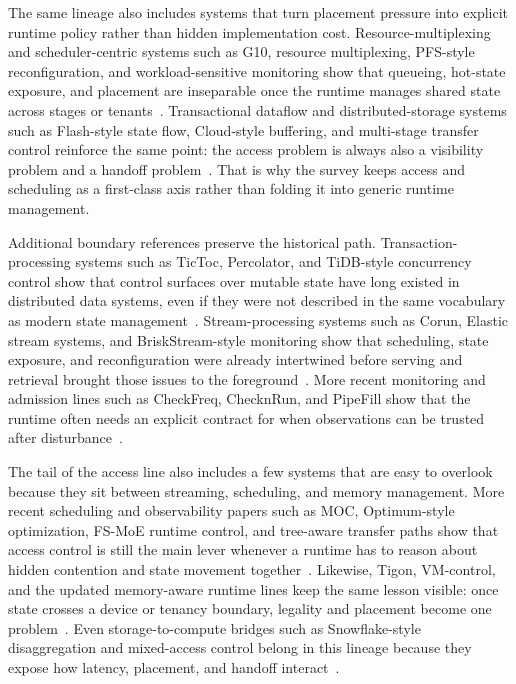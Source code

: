 The same lineage also includes systems that turn placement pressure into explicit runtime policy rather than hidden implementation cost. Resource-multiplexing and scheduler-centric systems such as G10, resource multiplexing, PFS-style reconfiguration, and workload-sensitive monitoring show that queueing, hot-state exposure, and placement are inseparable once the runtime manages shared state across stages or tenants~\cite{jiang2024megascale,he2025resourcemultiplexing,domingo2021pfsck,jiang2025shadowviews}. Transactional dataflow and distributed-storage systems such as Flash-style state flow, Cloud-style buffering, and multi-stage transfer control reinforce the same point: the access problem is always also a visibility problem and a handoff problem~\cite{fu2022sfs,fu2024autocheck,gao2025deck,li2020pegasus}. That is why the survey keeps access and scheduling as a first-class axis rather than folding it into generic runtime management.

Additional boundary references preserve the historical path. Transaction-processing systems such as TicToc, Percolator, and TiDB-style concurrency control show that control surfaces over mutable state have long existed in distributed data systems, even if they were not described in the same vocabulary as modern state management~\cite{yu2016tictoc,peng2010percolator}. Stream-processing systems such as Corun, Elastic stream systems, and BriskStream-style monitoring show that scheduling, state exposure, and reconfiguration were already intertwined before serving and retrieval brought those issues to the foreground~\cite{zhang2016corun,zhang2016elastic,zhang2019briskstream}. More recent monitoring and admission lines such as CheckFreq, ChecknRun, and PipeFill show that the runtime often needs an explicit contract for when observations can be trusted after disturbance~\cite{mohan2021checkfreq,eisenman2022checknrun,arfeen2024pipefill}.

The tail of the access line also includes a few systems that are easy to overlook because they sit between streaming, scheduling, and memory management. More recent scheduling and observability papers such as MOC, Optimum-style optimization, FS-MoE runtime control, and tree-aware transfer paths show that access control is still the main lever whenever a runtime has to reason about hidden contention and state movement together~\cite{cai2025moc,feng2025optimus,fsmoe25,wang2025wlbllm}. Likewise, Tigon, VM-control, and the updated memory-aware runtime lines keep the same lesson visible: once state crosses a device or tenancy boundary, legality and placement become one problem~\cite{huang2025tigon,zheng2024vmcu,tabatabai2024fbmm}. Even storage-to-compute bridges such as Snowflake-style disaggregation and mixed-access control belong in this lineage because they expose how latency, placement, and handoff interact~\cite{vuppalapati2020snowflake,zhou2024neomem}.


